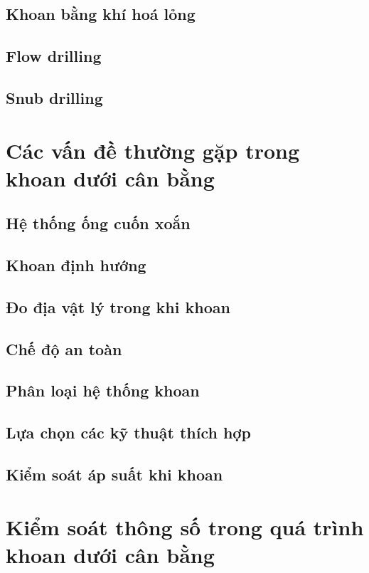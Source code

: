 \documentclass[13pt,a4paper]{article}
\begin{document}
\subsection{Khoan bằng khí hoá lỏng}
\subsection{Flow drilling}
\subsection{Snub drilling}

\section{Các vấn đề thường gặp trong khoan dưới cân bằng}
\subsection{Hệ thống ống cuốn xoắn}
\subsection{Khoan định hướng}
\subsection{Đo địa vật lý trong khi khoan}
\subsection{Chế độ an toàn}
\subsection{Phân loại hệ thống khoan}
\subsection{Lựa chọn các kỹ thuật thích hợp}
\subsection{Kiểm soát áp suất khi khoan}

\section{Kiểm soát thông số trong quá trình khoan dưới cân bằng}
\end{document}
